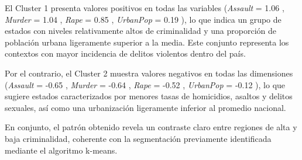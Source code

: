 \documentclass[
  spanish,
  11pt,
  a4paper,
  DIV=11,
  numbers=noendperiod]{scrartcl}
\newenvironment{Shaded}{\begin{snugshade}}{\end{snugshade}}
\newcommand{\AttributeTok}[1]{\textcolor[rgb]{0.40,0.45,0.13}{#1}}
\newcommand{\CommentTok}[1]{\textcolor[rgb]{0.37,0.37,0.37}{#1}}
\newcommand{\DecValTok}[1]{\textcolor[rgb]{0.68,0.00,0.00}{#1}}
\newcommand{\FloatTok}[1]{\textcolor[rgb]{0.68,0.00,0.00}{#1}}
\newcommand{\FunctionTok}[1]{\textcolor[rgb]{0.28,0.35,0.67}{#1}}
\newcommand{\NormalTok}[1]{\textcolor[rgb]{0.00,0.23,0.31}{#1}}
\newcommand{\OtherTok}[1]{\textcolor[rgb]{0.00,0.23,0.31}{#1}}
\newcommand{\SpecialCharTok}[1]{\textcolor[rgb]{0.37,0.37,0.37}{#1}}
\newcommand{\StringTok}[1]{\textcolor[rgb]{0.13,0.47,0.30}{#1}}
\begin{document}
El Cluster 1 presenta valores positivos en todas las variables
(\emph{Assault} = 1.06 , \emph{Murder} = 1.04 , \emph{Rape} = 0.85 ,
\emph{UrbanPop} = 0.19 ), lo que indica un grupo de estados con niveles
relativamente altos de criminalidad y una proporción de población urbana
ligeramente superior a la media. Este conjunto representa los contextos
con mayor incidencia de delitos violentos dentro del país.

Por el contrario, el Cluster 2 muestra valores negativos en todas las
dimensiones (\emph{Assault} = -0.65 , \emph{Murder} = -0.64 ,
\emph{Rape} = -0.52 , \emph{UrbanPop} = -0.12 ), lo que sugiere estados
caracterizados por menores tasas de homicidios, asaltos y delitos
sexuales, así como una urbanización ligeramente inferior al promedio
nacional.

En conjunto, el patrón obtenido revela un contraste claro entre regiones
de alta y baja criminalidad, coherente con la segmentación previamente
identificada mediante el algoritmo k-means.

\begin{Shaded}
\end{Shaded}
\end{document}
